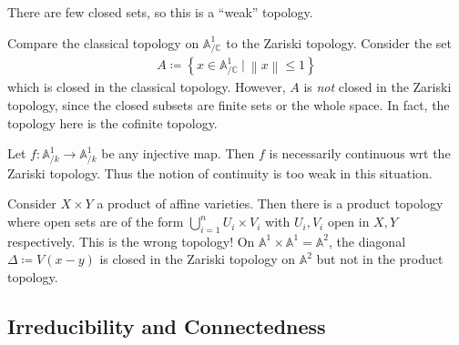 \begin{remark}

There are few closed sets, so this is a ``weak'' topology.

\end{remark}

\begin{example}

Compare the classical topology on \({\mathbb{A}}^1_{/{\mathbb{C}}}\) to
the Zariski topology. Consider the set
\begin{align*}
A\coloneqq\left\{{x\in {\mathbb{A}}^1_{/{\mathbb{C}}} {~\mathrel{\Big|}~}{\left\lVert {x} \right\rVert} \leq 1}\right\}
\end{align*}
which is closed in the classical topology. However, \(A\) is \emph{not}
closed in the Zariski topology, since the closed subsets are finite sets
or the whole space. In fact, the topology here is the cofinite topology.

\end{example}

\begin{example}

Let \(f: {\mathbb{A}}^1_{/k} \to {\mathbb{A}}^1_{/k}\) be any injective
map. Then \(f\) is necessarily continuous wrt the Zariski topology. Thus
the notion of continuity is too weak in this situation.

\end{example}

\begin{warnings}

Consider \(X\times Y\) a product of affine varieties. Then there is a
product topology where open sets are of the form
\(\bigcup_{i=1}^n U_i \times V_i\) with \(U_i, V_i\) open in \(X, Y\)
respectively. This is the wrong topology! On
\({\mathbb{A}}^1 \times{\mathbb{A}}^1 = {\mathbb{A}}^2\), the diagonal
\(\Delta \coloneqq V(x-y)\) is closed in the Zariski topology on
\({\mathbb{A}}^2\) but not in the product topology.

\end{warnings}

\hypertarget{irreducibility-and-connectedness}{%
\subsection{Irreducibility and
Connectedness}\label{irreducibility-and-connectedness}}

